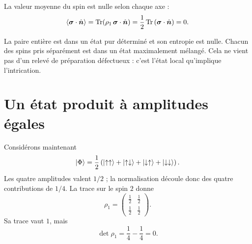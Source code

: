 La valeur moyenne du spin est nulle selon chaque axe :
\begin{equation}
\left\langle\bm{\sigma}\cdot\hat{\bm n}\right\rangle
=\operatorname{Tr}\!\left(
\rho_1\,\bm{\sigma}\cdot\hat{\bm n}
\right)
=\frac12\operatorname{Tr}
\left(\bm{\sigma}\cdot\hat{\bm n}\right)
=0.
\end{equation}

\begin{classroomqa}
\end{classroomqa}

La paire entière est dans un état pur déterminé et son entropie est nulle. Chacun des spins pris séparément est dans un état maximalement mélangé. Cela ne vient pas d’un relevé de préparation défectueux : c’est l’état local qu’implique l’intrication.

\section{Un état produit à amplitudes égales}

Considérons maintenant
\begin{equation}
\left\lvert\Phi\right\rangle
=\frac12\left(
\left\lvert\uparrow\uparrow\right\rangle
+\left\lvert\uparrow\downarrow\right\rangle
+\left\lvert\downarrow\uparrow\right\rangle
+\left\lvert\downarrow\downarrow\right\rangle
\right).
\end{equation}
Les quatre amplitudes valent \(1/2\) ; la normalisation découle donc des quatre contributions de \(1/4\). La trace sur le spin \(2\) donne
\begin{equation}
\rho_1
=
\begin{pmatrix}
\frac12&\frac12\\[2pt]
\frac12&\frac12
\end{pmatrix}.
\end{equation}
Sa trace vaut \(1\), mais
\begin{equation}
\det\rho_1
=\frac14-\frac14
=0.
\end{equation}

\begin{classroomqa}
\end{classroomqa}


